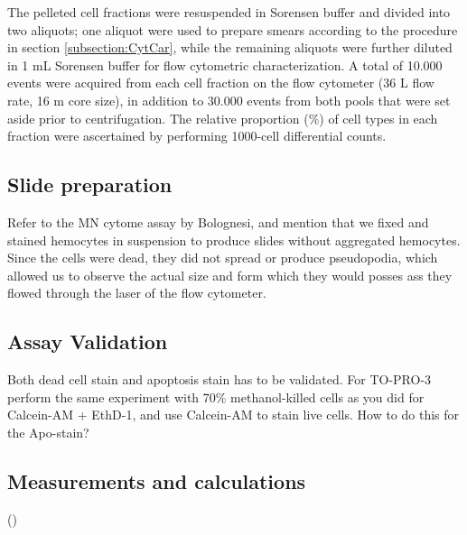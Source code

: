The pelleted cell fractions were resuspended in Sorensen buffer and divided into two aliquots; one aliquot were used to prepare smears according to the procedure in section \ref{subsection:CytCar}, while the remaining aliquots were further diluted in 1 mL Sorensen buffer for flow cytometric characterization. A total of 10.000 events were acquired from each cell fraction on the flow cytometer (36 \micro L flow rate, 16 \micro m core size), in addition to 30.000 events from both pools that were set aside prior to centrifugation. The relative proportion (\%) of cell types in each fraction were ascertained by performing 1000-cell differential counts.

\subsection{Slide preparation}
Refer to the MN cytome assay by Bolognesi, and mention that we fixed and stained hemocytes in suspension to produce slides without aggregated hemocytes. Since the cells were dead, they did not spread or produce pseudopodia, which allowed us to observe the actual size and form which they would posses ass they flowed through the laser of the flow cytometer.

\subsection{Assay Validation}
Both dead cell stain and apoptosis stain has to be validated. For TO-PRO-3 perform the same experiment with 70\% methanol-killed cells as you did for Calcein-AM + EthD-1, and use Calcein-AM to stain live cells.
How to do this for the Apo-stain?

\subsection{Measurements and calculations}
(\cite{R-project})